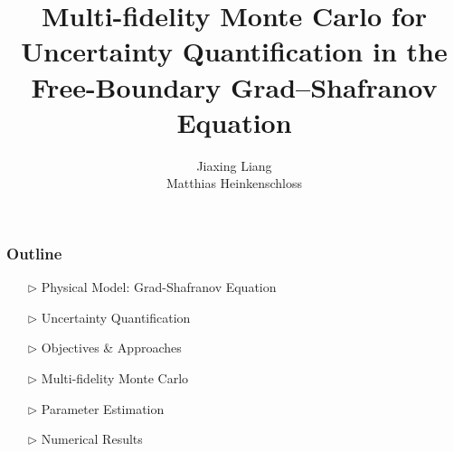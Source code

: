 \documentclass{beamer}
\title[MFMC for Tokamak UQ]{Multi-fidelity Monte Carlo for Uncertainty Quantification in the Free-Boundary Grad–Shafranov Equation}
\author[J.Liang]{\normalsize  Jiaxing Liang\\ Matthias Heinkenschloss}
\institute[Rice University]{\fontsize{8}{8} Department of Computational and Applied Mathematics, Rice University}
\begin{document}
\frame{\titlepage }

\begin{frame}[c]		
\frametitle{Outline}
\normalsize
\begin{itemize}[leftmargin=5pt] 
\item[$\triangleright$] Physical Model: Grad-Shafranov Equation
\vspace{0.3cm}
\item[$\triangleright$] Uncertainty Quantification 
\vspace{0.3cm}
\item[$\triangleright$] Objectives \& Approaches
\vspace{0.3cm}
\item[$\triangleright$] Multi-fidelity Monte Carlo
\vspace{0.3cm}
\item[$\triangleright$] Parameter Estimation
\vspace{0.3cm}
\item[$\triangleright$] Numerical Results
\end{itemize}
\end{frame}
\end{document}
